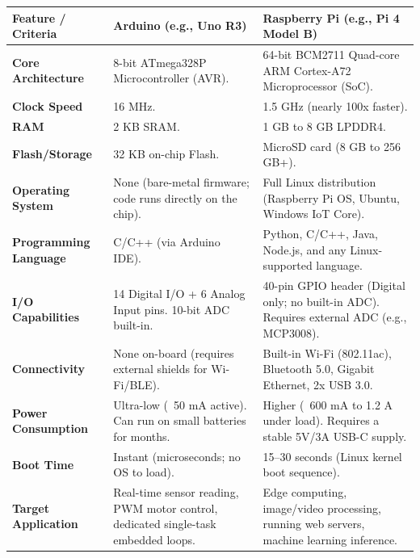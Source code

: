 \begin{table}[H]
\centering
\begin{tabular}{|p{}|p{}|p{}|}
\hline
Feature / Criteria & Arduino (e.g., Uno R3) & Raspberry Pi (e.g., Pi 4 Model B) \\
\hline
\textbf{Core Architecture} & 8-bit ATmega328P Microcontroller (AVR). & 64-bit BCM2711 Quad-core ARM Cortex-A72 Microprocessor (SoC). \\
\hline
\textbf{Clock Speed} & 16 MHz. & 1.5 GHz (nearly 100x faster). \\
\hline
\textbf{RAM} & 2 KB SRAM. & 1 GB to 8 GB LPDDR4. \\
\hline
\textbf{Flash/Storage} & 32 KB on-chip Flash. & MicroSD card (8 GB to 256 GB+). \\
\hline
\textbf{Operating System} & None (bare-metal firmware; code runs directly on the chip). & Full Linux distribution (Raspberry Pi OS, Ubuntu, Windows IoT Core). \\
\hline
\textbf{Programming Language} & C/C++ (via Arduino IDE). & Python, C/C++, Java, Node.js, and any Linux-supported language. \\
\hline
\textbf{I/O Capabilities} & 14 Digital I/O + 6 Analog Input pins. 10-bit ADC built-in. & 40-pin GPIO header (Digital only; no built-in ADC). Requires external ADC (e.g., MCP3008). \\
\hline
\textbf{Connectivity} & None on-board (requires external shields for Wi-Fi/BLE). & Built-in Wi-Fi (802.11ac), Bluetooth 5.0, Gigabit Ethernet, 2x USB 3.0. \\
\hline
\textbf{Power Consumption} & Ultra-low (~50 mA active). Can run on small batteries for months. & Higher (~600 mA to 1.2 A under load). Requires a stable 5V/3A USB-C supply. \\
\hline
\textbf{Boot Time} & Instant (microseconds; no OS to load). & 15–30 seconds (Linux kernel boot sequence). \\
\hline
\textbf{Target Application} & Real-time sensor reading, PWM motor control, dedicated single-task embedded loops. & Edge computing, image/video processing, running web servers, machine learning inference. \\
\hline
\end{tabular}
\end{table}


